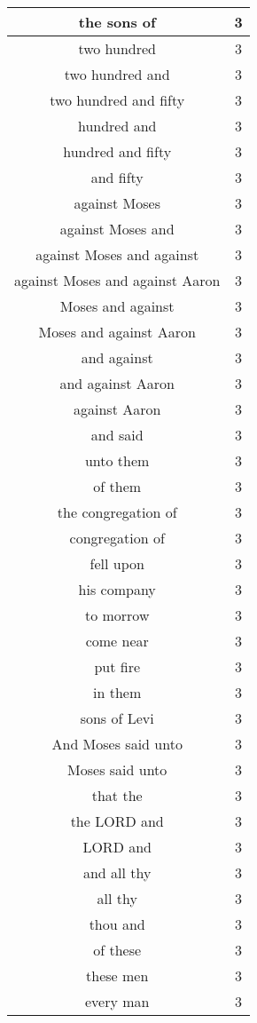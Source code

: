 \begin{center}
\begin{longtable}{|c|c|}
the sons of & 3\\ \hline 
two hundred & 3\\ \hline 
two hundred and & 3\\ \hline 
two hundred and fifty & 3\\ \hline 
hundred and & 3\\ \hline 
hundred and fifty & 3\\ \hline 
and fifty & 3\\ \hline 
against Moses & 3\\ \hline 
against Moses and & 3\\ \hline 
against Moses and against & 3\\ \hline 
against Moses and against Aaron & 3\\ \hline 
Moses and against & 3\\ \hline 
Moses and against Aaron & 3\\ \hline 
and against & 3\\ \hline 
and against Aaron & 3\\ \hline 
against Aaron & 3\\ \hline 
and said & 3\\ \hline 
unto them & 3\\ \hline 
of them & 3\\ \hline 
the congregation of & 3\\ \hline 
congregation of & 3\\ \hline 
fell upon & 3\\ \hline 
his company & 3\\ \hline 
to morrow & 3\\ \hline 
come near & 3\\ \hline 
put fire & 3\\ \hline 
in them & 3\\ \hline 
sons of Levi & 3\\ \hline 
And Moses said unto & 3\\ \hline 
Moses said unto & 3\\ \hline 
that the & 3\\ \hline 
the LORD and & 3\\ \hline 
LORD and & 3\\ \hline 
and all thy & 3\\ \hline 
all thy & 3\\ \hline 
thou and & 3\\ \hline 
of these & 3\\ \hline 
these men & 3\\ \hline 
every man & 3\\ \hline 

\end{longtable}
\end{center}
